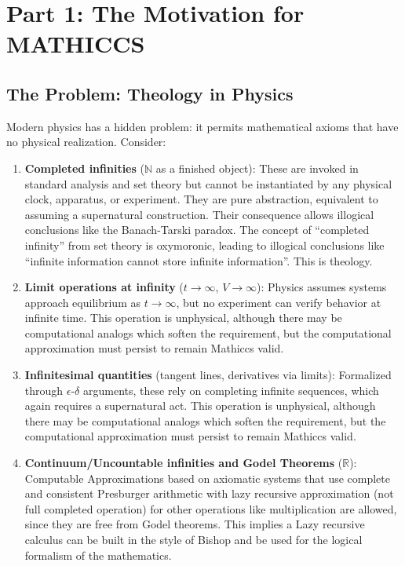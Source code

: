 \documentclass[11pt,a4paper]{article}
\begin{document}
\section{Part 1: The Motivation for MATHICCS}

\subsection{The Problem: Theology in Physics}

Modern physics has a hidden problem: it permits mathematical axioms that have no physical realization. Consider:

\begin{enumerate}
\item \textbf{Completed infinities} ($\mathbb{N}$ as a finished object): These are invoked in standard analysis and set theory but cannot be instantiated by any physical clock, apparatus, or experiment. They are pure abstraction, equivalent to assuming a supernatural construction. Their consequence allows illogical conclusions like the Banach-Tarski paradox. The concept of ``completed infinity'' from set theory is oxymoronic, leading to illogical conclusions like ``infinite information cannot store infinite information''. This is theology.

\item \textbf{Limit operations at infinity} ($t \to \infty$, $V \to \infty$): Physics assumes systems approach equilibrium as $t \to \infty$, but no experiment can verify behavior at infinite time. This operation is unphysical, although there may be computational analogs which soften the requirement, but the computational approximation must persist to remain Mathiccs valid.

\item \textbf{Infinitesimal quantities} (tangent lines, derivatives via limits): Formalized through $\epsilon$-$\delta$ arguments, these rely on completing infinite sequences, which again requires a supernatural act. This operation is unphysical, although there may be computational analogs which soften the requirement, but the computational approximation must persist to remain Mathiccs valid.

\item \textbf{Continuum/Uncountable infinities and Godel Theorems} ($\mathbb{R}$): Computable Approximations based on axiomatic systems that use complete and consistent Presburger arithmetic with lazy recursive approximation (not full completed operation) for other operations like multiplication are allowed, since they are free from Godel theorems. This implies a Lazy recursive calculus can be built in the style of Bishop and be used for the logical formalism of the mathematics.


\end{enumerate}
\end{document}
